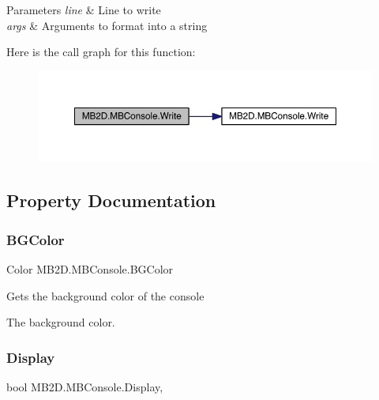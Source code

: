 \begin{DoxyParams}{Parameters}
{\em line} & Line to write\\
\hline
{\em args} & Arguments to format into a string\\
\hline
\end{DoxyParams}
Here is the call graph for this function\+:\nopagebreak
\begin{figure}[H]
\begin{center}
\leavevmode
\includegraphics[width=350pt]{class_m_b2_d_1_1_m_b_console_ad7f7617e28472374b97fee653bd786be_cgraph}
\end{center}
\end{figure}


\subsection{Property Documentation}
\hypertarget{class_m_b2_d_1_1_m_b_console_a03439bac4bc6f5c737d221b3a093792d}{}\label{class_m_b2_d_1_1_m_b_console_a03439bac4bc6f5c737d221b3a093792d} 
\subsubsection{\texorpdfstring{B\+G\+Color}{BGColor}}
{\footnotesize\ttfamily Color M\+B2\+D.\+M\+B\+Console.\+B\+G\+Color\hspace{0.3cm}{\ttfamily [get]}}



Gets the background color of the console 

The background color.\hypertarget{class_m_b2_d_1_1_m_b_console_a44be86cd008f735652365afccc777ad1}{}\label{class_m_b2_d_1_1_m_b_console_a44be86cd008f735652365afccc777ad1} 
\subsubsection{\texorpdfstring{Display}{Display}}
{\footnotesize\ttfamily bool M\+B2\+D.\+M\+B\+Console.\+Display\hspace{0.3cm}{\ttfamily [get]}, {\ttfamily [set]}}



